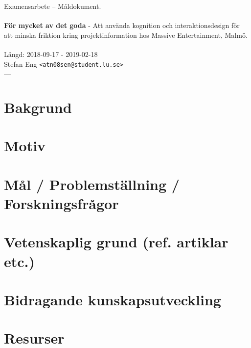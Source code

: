 \documentclass{article}
\begin{document}
\begin{center}

  Examensarbete -- Måldokument. \\
  \ \\
  {\large
    \textbf{För mycket av det goda} -
    Att använda kognition och interaktionsdesign för
    att minska friktion kring projektinformation hos Massive
    Entertainment, Malmö. \\
  }
  \ \\
  Längd: 2018-09-17 - 2019-02-18\\
  Stefan Eng \texttt{<atn08sen@student.lu.se>}
  \ \\
  ---
  \vspace{-0.3cm}

\end{center}

\section*{Bakgrund}

\section*{Motiv}

\section*{Mål / Problemställning / Forskningsfrågor}

\section*{Vetenskaplig grund (ref. artiklar etc.)}

\section*{Bidragande kunskapsutveckling}

\section*{Resurser}
\end{document}
